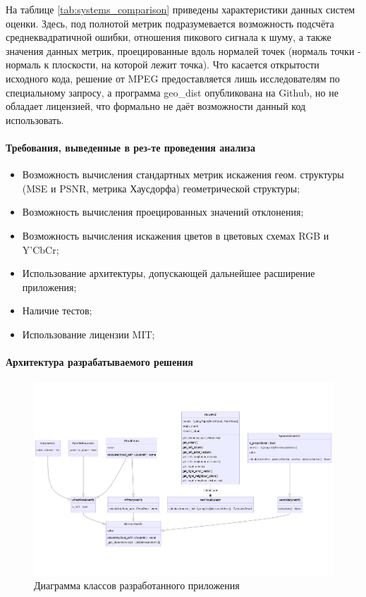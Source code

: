\documentclass[a4paper,12pt]{extreport}
\begin{document}
На таблице \ref{tab:systems_comparison} приведены характеристики данных систем
оценки. Здесь, под полнотой метрик подразумевается возможность подсчёта
среднеквадратичной ошибки, отношения пикового сигнала к шуму, а также значения
данных метрик, проецированные вдоль нормалей точек (нормаль точки - нормаль к
плоскости, на которой лежит точка). Что касается открытости исходного кода,
решение от MPEG предоставляется лишь исследователям по специальному запросу, а
программа geo\_dist опубликована на Github, но не обладает лицензией, что
формально не даёт возможности данный код использовать.

\paragraph{Требования, выведенные в рез-те проведения анализа}

\begin{itemize}
    \item Возможность вычисления стандартных метрик искажения геом. структуры (MSE и PSNR,
    метрика Хаусдорфа) геометрической структуры;
    \item Возможность вычисления проецированных значений отклонения;
    \item Возможность вычисления искажения цветов в цветовых схемах RGB и Y'CbCr;
    \item Использование архитектуры, допускающей дальнейшее расширение
    приложения;
    \item Наличие тестов;
    \item Использование лицензии MIT;
\end{itemize}

\paragraph{Архитектура разрабатываемого решения}

\begin{figure}[H]
    \centering
    \includegraphics[width=0.7\linewidth]{assets/classes.png}
    \caption{Диаграмма классов разработанного приложения}
    \label{img:metric_classes}
\end{figure}
\end{document}
